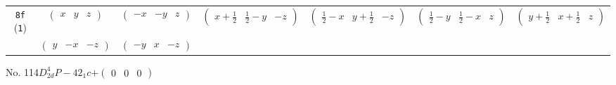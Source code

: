 \documentclass[fleqn,9pt,landscape]{jsarticle}
\begin{document}
\begin{center}
\begin{longtable}{ccccccc}
{\tt 8f} ({\tt 1}) & $ \begin{pmatrix} x & y & z \end{pmatrix} $ & $ \begin{pmatrix} - x & - y & z \end{pmatrix} $ & $ \begin{pmatrix} x + \frac{1}{2} & \frac{1}{2} - y & - z \end{pmatrix} $ & $ \begin{pmatrix} \frac{1}{2} - x & y + \frac{1}{2} & - z \end{pmatrix} $ & $ \begin{pmatrix} \frac{1}{2} - y & \frac{1}{2} - x & z \end{pmatrix} $ & $ \begin{pmatrix} y + \frac{1}{2} & x + \frac{1}{2} & z \end{pmatrix} $ \\
& $ \begin{pmatrix} y & - x & - z \end{pmatrix} $ & $ \begin{pmatrix} - y & x & - z \end{pmatrix} $ & $  $ & $  $ & $  $ & $  $ \\
\end{longtable}
\end{center}
\newpage
No. 114\quad$D_{2d}^{4}$\quad$P-42_1c$\quad[ tetragonal ]\quad$+\begin{pmatrix} 0 & 0 & 0 \end{pmatrix}$
\end{document}
